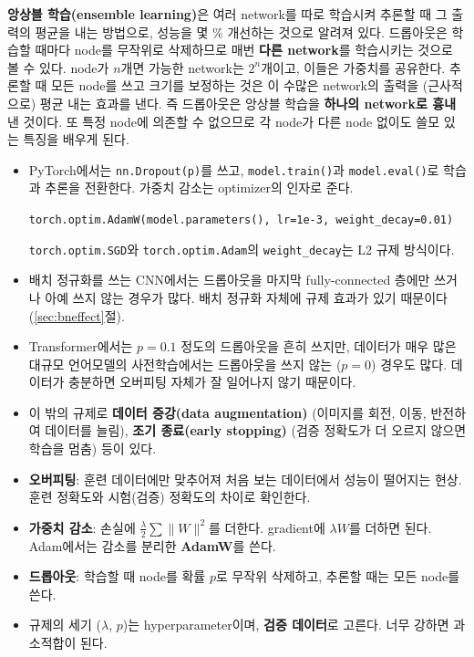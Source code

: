 \documentclass[11pt,a4paper]{article}
\begin{document}
\begin{thinkbox}
\textbf{앙상블 학습(ensemble learning)}은 여러 network를 따로 학습시켜 추론할 때 그 출력의 평균을 내는 방법으로,
성능을 몇 \% 개선하는 것으로 알려져 있다.
드롭아웃은 학습할 때마다 node를 무작위로 삭제하므로 매번 \textbf{다른 network}를 학습시키는 것으로 볼 수 있다.
node가 $n$개면 가능한 network는 $2^n$개이고, 이들은 가중치를 공유한다.
추론할 때 모든 node를 쓰고 크기를 보정하는 것은 이 수많은 network의 출력을 (근사적으로) 평균 내는 효과를 낸다.
즉 드롭아웃은 앙상블 학습을 \textbf{하나의 network로 흉내} 낸 것이다.
또 특정 node에 의존할 수 없으므로 각 node가 다른 node 없이도 쓸모 있는 특징을 배우게 된다.
\end{thinkbox}

\begin{remarkbox}[실무에서의 규제]
\begin{itemize}[leftmargin=1.5em]
\item PyTorch에서는 \texttt{nn.Dropout(p)}를 쓰고, \texttt{model.train()}과 \texttt{model.eval()}로 학습과 추론을 전환한다.
가중치 감소는 optimizer의 인자로 준다.
\begin{center}
\texttt{torch.optim.AdamW(model.parameters(), lr=1e-3, weight\_decay=0.01)}
\end{center}
\texttt{torch.optim.SGD}와 \texttt{torch.optim.Adam}의 \texttt{weight\_decay}는 L2 규제 방식이다.
\item 배치 정규화를 쓰는 CNN에서는 드롭아웃을 마지막 fully-connected 층에만 쓰거나 아예 쓰지 않는 경우가 많다.
배치 정규화 자체에 규제 효과가 있기 때문이다 (\ref{sec:bneffect}절).
\item Transformer에서는 $p=0.1$ 정도의 드롭아웃을 흔히 쓰지만,
데이터가 매우 많은 대규모 언어모델의 사전학습에서는 드롭아웃을 쓰지 않는 ($p=0$) 경우도 많다.
데이터가 충분하면 오버피팅 자체가 잘 일어나지 않기 때문이다.
\item 이 밖의 규제로 \textbf{데이터 증강(data augmentation)} (이미지를 회전, 이동, 반전하여 데이터를 늘림),
\textbf{조기 종료(early stopping)} (검증 정확도가 더 오르지 않으면 학습을 멈춤) 등이 있다.
\end{itemize}
\end{remarkbox}

\begin{keybox}[바른 학습을 위해: 정리]
\begin{itemize}[leftmargin=1.5em]
\item \textbf{오버피팅}: 훈련 데이터에만 맞추어져 처음 보는 데이터에서 성능이 떨어지는 현상.
훈련 정확도와 시험(검증) 정확도의 차이로 확인한다.
\item \textbf{가중치 감소}: 손실에 $\frac\lambda2\sum\lVert W\rVert^2$를 더한다. gradient에 $\lambda W$를 더하면 된다.
Adam에서는 감소를 분리한 \textbf{AdamW}를 쓴다.
\item \textbf{드롭아웃}: 학습할 때 node를 확률 $p$로 무작위 삭제하고, 추론할 때는 모든 node를 쓴다.
\item 규제의 세기 ($\lambda$, $p$)는 hyperparameter이며, \textbf{검증 데이터}로 고른다.
너무 강하면 과소적합이 된다.
\end{itemize}
\end{keybox}
\end{document}
